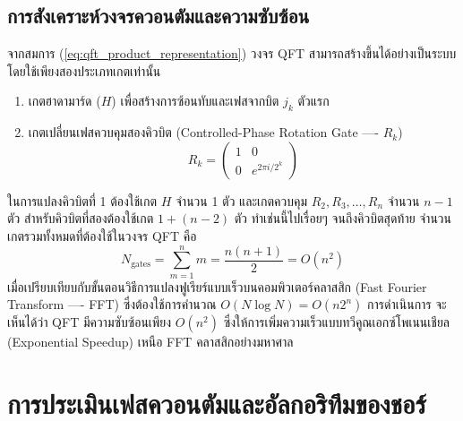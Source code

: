 \subsection{การสังเคราะห์วงจรควอนตัมและความซับซ้อน}
จากสมการ (\ref{eq:qft_product_representation}) วงจร QFT สามารถสร้างขึ้นได้อย่างเป็นระบบโดยใช้เพียงสองประเภทเกตเท่านั้น
\begin{enumerate}
    \item เกตฮาดามาร์ด ($H$) เพื่อสร้างการซ้อนทับและเฟสจากบิต $j_k$ ตัวแรก
    \item เกตเปลี่ยนเฟสควบคุมสองคิวบิต (Controlled-Phase Rotation Gate ---- $R_k$)
    \begin{equation}
    R_k = \begin{pmatrix} 1 & 0 \\ 0 & e^{2\pi i / 2^k} \end{pmatrix}
    \end{equation}
\end{enumerate}

ในการแปลงคิวบิตที่ 1 ต้องใช้เกต $H$ จำนวน 1 ตัว และเกตควบคุม $R_2, R_3, \dots, R_n$ จำนวน $n-1$ ตัว สำหรับคิวบิตที่สองต้องใช้เกต $1 + (n-2)$ ตัว ทำเช่นนี้ไปเรื่อยๆ จนถึงคิวบิตสุดท้าย จำนวนเกตรวมทั้งหมดที่ต้องใช้ในวงจร QFT คือ
\begin{equation}
N_{\text{gates}} = \sum_{m=1}^n m = \frac{n(n+1)}{2} = O(n^2)
\label{eq:qft_gate_complexity}
\end{equation}
เมื่อเปรียบเทียบกับขั้นตอนวิธีการแปลงฟูเรียร์แบบเร็วบนคอมพิวเตอร์คลาสสิก (Fast Fourier Transform ---- FFT) ซึ่งต้องใช้การคำนวณ $O(N \log N) = O(n 2^n)$ การดำเนินการ จะเห็นได้ว่า QFT มีความซับซ้อนเพียง $O(n^2)$ ซึ่งให้การเพิ่มความเร็วแบบทวีคูณเอกซ์โพเนนเชียล (Exponential Speedup) เหนือ FFT คลาสสิกอย่างมหาศาล

\section{การประเมินเฟสควอนตัมและอัลกอริทึมของชอร์}

